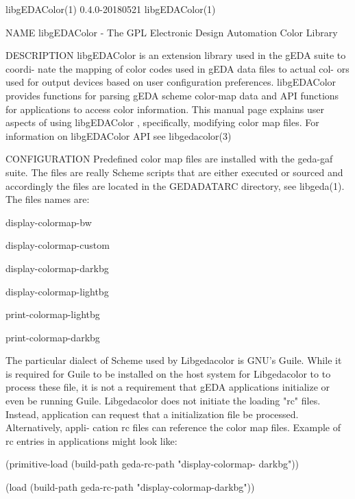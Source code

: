 libgEDAColor(1)                 0.4.0-20180521                 libgEDAColor(1)



NAME
       libgEDAColor - The GPL Electronic Design Automation Color Library

DESCRIPTION
       libgEDAColor  is an extension library used in the gEDA suite to coordi-
       nate the mapping of color codes used in gEDA data files to actual  col-
       ors  used  for  output devices based on user configuration preferences.
       libgEDAColor provides functions for parsing gEDA scheme color-map  data
       and  API  functions  for applications to access color information. This
       manual page explains user aspects of using libgEDAColor , specifically,
       modifying  color  map  files.  For  information on libgEDAColor API see
       libgedacolor(3)

CONFIGURATION
       Predefined color map files are installed with the geda-gaf  suite.  The
       files are really Scheme scripts that are either executed or sourced and
       accordingly the files are located  in  the  GEDADATARC  directory,  see
       libgeda(1).  The files names are:

              display-colormap-bw

              display-colormap-custom

              display-colormap-darkbg

              display-colormap-lightbg

              print-colormap-lightbg

              print-colormap-darkbg

       The  particular  dialect of Scheme used by Libgedacolor is GNU's Guile.
       While it is required for Guile to be installed on the host  system  for
       Libgedacolor  to  to  process  these file, it is not a requirement that
       gEDA applications initialize or even be  running  Guile.   Libgedacolor
       does  not  initiate  the  loading  "rc" files. Instead, application can
       request that a initialization file be processed. Alternatively,  appli-
       cation  rc  files  can  reference  the  color  map files. Example of rc
       entries in applications might look like:

              (primitive-load  (build-path   geda-rc-path   "display-colormap-
              darkbg"))

              (load (build-path geda-rc-path "display-colormap-darkbg"))

